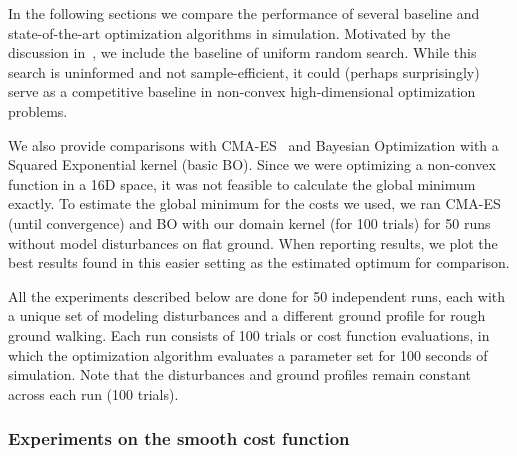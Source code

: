 In the following sections we compare the performance of several baseline and state-of-the-art optimization algorithms in simulation. Motivated by the discussion in~\cite{calandra2016bayesian}, we include the baseline of uniform random search. While this search is uninformed and not sample-efficient, it could (perhaps surprisingly) serve as a competitive baseline in non-convex high-dimensional optimization problems. 

We also provide comparisons with \mbox{CMA-ES}~\citep{hansen2006cma} and Bayesian Optimization with a Squared Exponential kernel (basic BO). Since we were optimizing a non-convex function in a 16D space, it was not feasible to calculate the global minimum exactly. To estimate the global minimum for the costs we used, we ran CMA-ES (until convergence) and BO with our domain kernel (for 100 trials) for 50 runs without model disturbances on flat ground. 
When reporting results, we plot the best results found in this easier setting as the estimated optimum for comparison.

All the experiments described below are done for 50 independent runs, each with a unique set of modeling disturbances and a different ground profile for rough ground walking. Each run  consists of 100 trials or cost function evaluations, in which the optimization algorithm evaluates a parameter set for 100 seconds of simulation. Note that the disturbances and ground profiles remain constant across each run (100 trials).

\subsubsection{Experiments on the smooth cost function}

